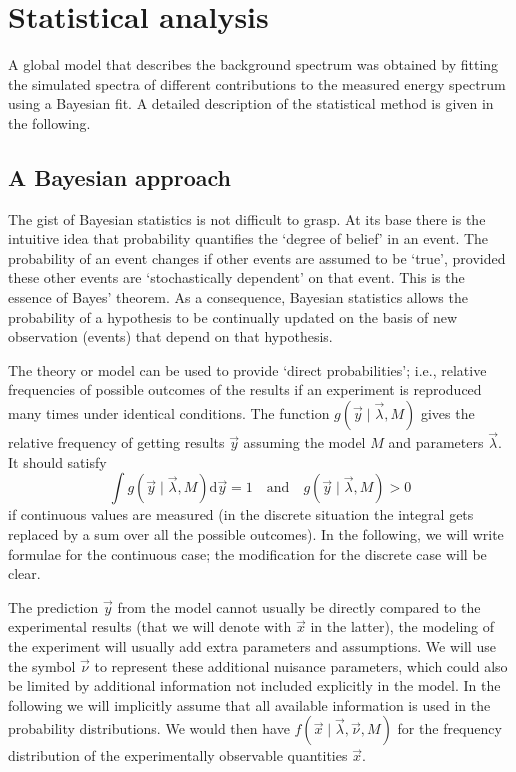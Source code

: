\section{Statistical analysis}\label{sec:bayes}
A global model that describes the background spectrum was obtained by fitting the simulated spectra of different contributions to the measured energy spectrum using a Bayesian fit. A detailed description of the statistical method is given in the following.
\subsection*{A Bayesian approach}
The gist of Bayesian statistics is not difficult to grasp. At its base there is the intuitive idea that probability quantifies the `degree of belief' in an event. The probability of an event changes if other events are assumed to be `true', provided these other events are `stochastically dependent' on that event. This is the essence of Bayes' theorem. As a consequence, Bayesian statistics allows the probability of a hypothesis to be continually updated on the basis of new observation (events) that depend on that hypothesis. 

 The theory or model can be used to provide `direct probabilities'; i.e., relative frequencies of possible outcomes of the results if an experiment is reproduced many times under identical conditions. The function $g(\vec{y}\mid\vec{\lambda},M)$ gives the relative frequency of getting results $\vec{y}$ assuming the model $M$ and parameters $\vec{\lambda}$. It should satisfy
\begin{equation}\int g(\vec{y}\mid\vec{\lambda},M)\text{d}\vec{y}=1 \quad\text{and}\quad g(\vec{y}\mid\vec{\lambda},M)>0\end{equation}
if continuous values are measured (in the discrete situation the integral gets replaced by a sum over all the possible outcomes). In the following, we will write formulae for the continuous case; the modification for the discrete case will be clear.

The prediction $\vec{y}$ from the model cannot usually be directly compared to the experimental results (that we will denote with $\vec{x}$ in the latter), the modeling of the experiment will usually add extra parameters and assumptions. We will use the symbol $\vec{\nu}$ to represent these additional nuisance parameters, which could also be limited by additional information not included explicitly in the model. In the following we will implicitly assume that all available information is used in the probability distributions. We would then have $f(\vec{x}\mid\vec{\lambda},\vec{\nu},M)$ for the frequency distribution of the experimentally observable quantities $\vec{x}$.

